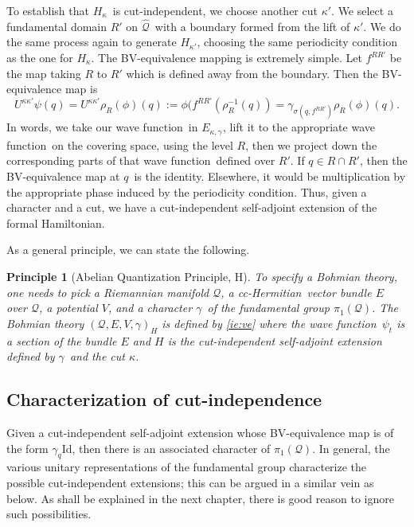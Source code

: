 \documentclass[11pt]{article}
\newtheorem{principle}{Principle}
\theoremstyle{remark}
\begin{document}
To establish that \ensuremath{H_{\ensuremath{\kappa}}}\ is cut-independent, we choose another cut
\ensuremath{\kappa'}. We select a fundamental domain $R'$ on \ensuremath{\widehat{\ensuremath{\mathcal{Q}}}}\ 
 with a boundary formed
from the lift of \ensuremath{\kappa'}. We do the same process again to generate
\ensuremath{H_{\ensuremath{\kappa'}}}, choosing the same periodicity condition as the one for \ensuremath{H_{\ensuremath{\kappa}}}. 
The BV-equivalence mapping is extremely simple. Let $f^{RR'}$ be the
map taking $R$ to $R'$ which is defined away from the boundary.
Then the BV-equivalence map is
\[
\ensuremath{U^{\ensuremath{\kappa}{}  \ensuremath{\kappa}{'}}} \ensuremath{\psi}(\ensuremath{q}) 
= \ensuremath{U^{\ensuremath{\kappa}{}  \ensuremath{\kappa}{'}}} \ensuremath{\ensuremath{\rho}}_R(\phi) (\ensuremath{q}) 
\ensuremath{:=} \phi(f^{RR'}(\ensuremath{\ensuremath{\rho}}^{-1}_R(\ensuremath{q})) 
=\ensuremath{\gamma}_{\sigma(\ensuremath{q}, f^{RR'})} \ensuremath{\ensuremath{\rho}}_R(\phi) (\ensuremath{q}).
\]
In words, we take our wave function\ in \ensuremath{E_{\ensuremath{\kappa}, \ensuremath{\gamma_{}}}}, lift it to the appropriate wave function\ on
the covering space, using the level $R$, then we project down the
corresponding parts of that wave function\ defined over $R'$.  If
$\ensuremath{q} \in R \cap R'$, then the BV-equivalence map at \ensuremath{q}\ is the
identity. Elsewhere, it would be multiplication by the appropriate
phase induced by the periodicity condition.  
Thus, given a character and a cut, we have a 
 cut-independent self-adjoint extension of the formal 
Hamiltonian. 


As a general principle, we can state the following. 
\begin{principle}[Abelian Quantization Principle, H]
To specify a Bohmian theory, one needs to pick a Riemannian manifold
 $\ensuremath{\mathcal{Q}}$, a 
 cc-Hermitian\ vector bundle $E$ over
 \ensuremath{\mathcal{Q}}, a potential $V$, and a character \ensuremath{\gamma}\
 of the fundamental group \ensuremath{\pi_1 ({\ensuremath{\mathcal{Q}}})}.
 The Bohmian
 theory $(\ensuremath{\mathcal{Q}}, E, V, \ensuremath{\gamma})_H$ is defined by 
\eqref{ie:ve}
where  the wave function\
$\ensuremath{\psi}_t$ is a section of the bundle $ E$ and $H$ is the cut-independent
 self-adjoint extension defined by \ensuremath{\gamma}\ and the cut \ensuremath{\kappa}. 

\end{principle}


\subsection{ Characterization of cut-independence }
Given a cut-independent self-adjoint
extension whose BV-equivalence map is
of the form 
$ \gamma_{ \ensuremath{q} } \ensuremath{\text{Id}} $, 
then there is an associated character of \ensuremath{\pi_1 ({\ensuremath{\mathcal{Q}}})}.
In general, 
the various unitary representations of the fundamental group characterize the
possible cut-independent extensions; this can be argued in a similar
vein as below. As shall be explained in the next chapter, there is
good reason to ignore such possibilities. 
\end{document}
